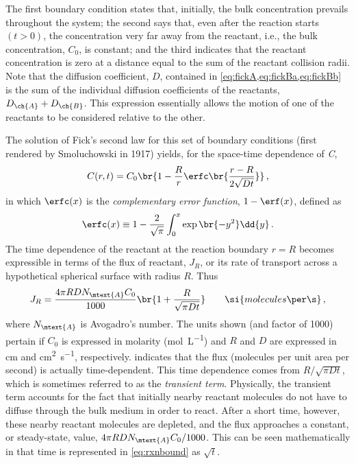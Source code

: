 The first boundary condition states that, initially, the bulk concentration prevails throughout the system; the second says that, even after the reaction starts \( (t > 0) \), the concentration very far away from the reactant, i.e., the bulk concentration, \( C_0 \), is constant; and the third indicates that the reactant concentration is zero at a distance equal to the sum of the reactant collision radii. 
Note that the diffusion coefficient, \( D \), contained in \cref{eq:fickA,eq:fickBa,eq:fickBb} is the sum of the individual diffusion coefficients of the reactants, \( D_{\ch{A}} + D_{\ch{B}} \). 
This expression essentially allows the motion of one of the reactants to be considered relative to the other. 

The solution of Fick's second law for this set of boundary conditions (first rendered by Smoluchowski in 1917) yields, for the space-time dependence of \emph{C},
\begin{equation}
	C(r, t) = C_0 \br{ 1 - \frac{R}{r} \erfc\br{ \frac{r-R}{2 \sqrt{D t} }}} \, , 
\end{equation}
in which \( \erfc(x) \) is the \emph{complementary error function}, \( 1 - \erf(x) \), defined as
\[
	\erfc(x) \equiv 1 - \frac{2}{\sqrt{\pi}}\int_0^x \exp\br{ -y^2 } \dd{y} \, .
\]
The time dependence of the reactant at the reaction boundary \( r = R \) becomes expressible in terms of the flux of reactant, \( J_R \), or its rate of transport across a hypothetical spherical surface with radius \( R \). 
Thus
\begin{equation}
	J_R = \frac{4\pi R D N_\mtext{A} C_0}{1000} \br{ 1 + \frac{R}{\sqrt{\pi D t}}} \qquad \si{molecules \per \s} \, ,
	\label{eq:rxnbound}
\end{equation}
where \( N_\mtext{A} \) is Avogadro's number. 
The units shown (and factor of 1000) pertain if \( C_0 \) is expressed in molarity (\si{\mol\per\liter}) and \( R \) and \( D \) are expressed in \si{\cm} and \si{\cm\squared \per \s}, respectively.
 indicates that the flux (molecules per unit area per second) is actually time-dependent. 
This time dependence comes from \( R/\sqrt{\pi D t} \), which is sometimes referred to as the \emph{transient term}. 
Physically, the transient term accounts for the fact that initially nearby reactant molecules do not have to diffuse through the bulk medium in order to react. 
After a short time, however, these nearby reactant molecules are depleted, and the flux approaches a constant, or steady-state, value, \( 4\pi R D N_\mtext{A} C_0 / 1000 \). 
This can be seen mathematically in that time is represented in \cref{eq:rxnbound} as \( \sqrt{t} \). 

